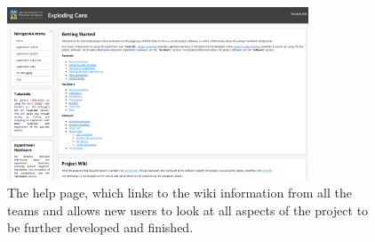 \begin{figure}[H]
	\centering
	\includegraphics[width=0.8\textwidth]{figures/GUI_help.png}
	\caption{The help page, which links to the wiki information from all the teams and allows new users to look at all aspects of the project to be further developed and finished. } 
\end{figure}




